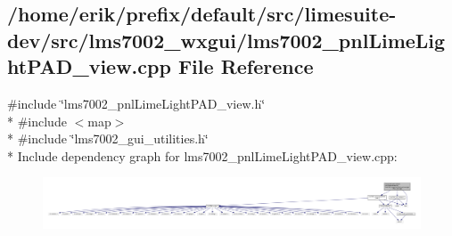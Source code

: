 \subsection{/home/erik/prefix/default/src/limesuite-\/dev/src/lms7002\+\_\+wxgui/lms7002\+\_\+pnl\+Lime\+Light\+P\+A\+D\+\_\+view.cpp File Reference}
\label{lms7002__pnlLimeLightPAD__view_8cpp}
{\ttfamily \#include \char`\"{}lms7002\+\_\+pnl\+Lime\+Light\+P\+A\+D\+\_\+view.\+h\char`\"{}}\\*
{\ttfamily \#include $<$map$>$}\\*
{\ttfamily \#include \char`\"{}lms7002\+\_\+gui\+\_\+utilities.\+h\char`\"{}}\\*
Include dependency graph for lms7002\+\_\+pnl\+Lime\+Light\+P\+A\+D\+\_\+view.\+cpp\+:
\nopagebreak
\begin{figure}[H]
\begin{center}
\leavevmode
\includegraphics[width=350pt]{db/ded/lms7002__pnlLimeLightPAD__view_8cpp__incl}
\end{center}
\end{figure}
